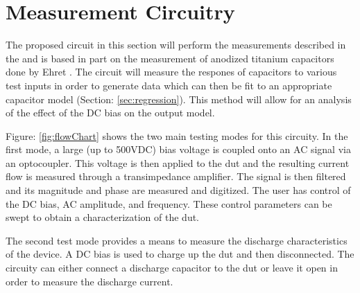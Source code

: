 \section {Measurement Circuitry}
\label{sec:measCirc}
\renewcommand{\loadeq}[1]{%
   \ExecuteMetaData[./equations/circuitry.tex]{eq#1}%
}

The proposed circuit in this section will perform the measurements described in the  and is based in part on the measurement of anodized titanium capacitors done by Ehret \cite{steve_thesis}. The circuit will measure the respones of capacitors to various test inputs in order to generate data which can then be fit to an appropriate capacitor model (Section: \ref{sec:regression}). This method will allow for an analysis of the effect of the DC bias on the output model.

Figure: \ref{fig:flowChart} shows the two main testing modes for this circuity. In the first mode, a large (up to 500VDC) bias voltage is coupled onto an AC signal via an optocoupler. This voltage is then applied to the \gls{dut} and the resulting current flow is measured through a transimpedance amplifier. The signal is then filtered and its magnitude and phase are measured and digitized. The user has control of the DC bias, AC amplitude, and frequency. These control parameters can be swept to obtain a characterization of the \gls{dut}.

The second test mode provides a means to measure the discharge characteristics of the device. A DC bias is used to charge up the \gls{dut} and then disconnected. The circuity can either connect a discharge capacitor to the \gls{dut} or leave it open in order to measure the discharge current.


\nocite{my_ieeePaper}

















